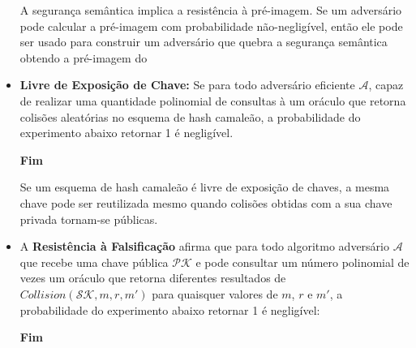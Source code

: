 \documentclass[a4paper]{article}
\begin{document}
\begin{itemize}
  A segurança semântica implica a resistência à pré-imagem. Se um
  adversário pode calcular a pré-imagem com probabilidade
  não-negligível, então ele pode ser usado para construir um
  adversário que quebra a segurança semântica obtendo a pré-imagem do 
  
\item\textbf{Livre de Exposição de Chave:} Se para todo adversário
  eficiente $\mathcal{A}$, capaz de realizar uma quantidade polinomial
  de consultas à um oráculo que retorna colisões aleatórias no esquema
  de hash camaleão, a probabilidade do experimento abaixo retornar 1 é
  negligível.

\noindent
  \begin{algorithm}[H]
    \SetAlgoLined
     \textbf{Fim}
  \end{algorithm}

  Se um esquema de hash camaleão é livre de exposição de chaves, a
  mesma chave pode ser reutilizada mesmo quando colisões obtidas com a
  sua chave privada tornam-se públicas.
  
\item A \textbf{Resistência à Falsificação} afirma que para todo algoritmo
  adversário $\mathcal{A}$ que recebe uma chave pública $\mathcal{PK}$
  e pode consultar um número polinomial de vezes um oráculo que
  retorna diferentes resultados de $Collision(\mathcal{SK}, m, r, m')$
  para quaisquer valores de $m$, $r$ e $m'$, a probabilidade do
  experimento abaixo retornar 1 é negligível:

  \noindent
  \begin{algorithm}[H]
    \SetAlgoLined
     \textbf{Fim}
  \end{algorithm}


\end{itemize}
\end{document}
